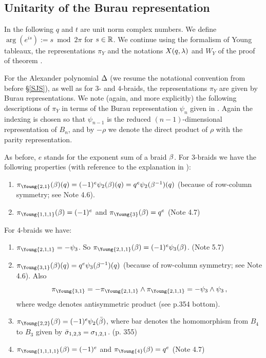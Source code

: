 \subsection{Unitarity of the Burau representation\label{SUn}}

In the following $q$ and $t$ are unit norm complex numbers.
We define $\arg (e^{is}):=s\bmod 2\pi$ for $s\in{\Bbb R}$.
We continue using the formalism of Young tableaux,
the representations $\pi_Y$ and the notations $X(q,\lambda)$
and $W_Y$ of the proof of theorem .

For the Alexander polynomial $\Delta$ (we resume the
notational convention from before \S\ref{SJS}), as well as
for $3$- and $4$-braids, the
representations $\pi_Y$ are given by Burau representations. We note
(again, and more explicitly) the following descriptions of $\pi_Y$
in terms of the Burau representation $\psi_n$ given in \cite{Jones}.
Again the indexing is chosen so that $\psi_{n-1}$ is the reduced
$(n-1)$-dimensional representation of $B_n$, and by $-\rho$ we denote
the direct product of $\rho$ with the parity representation.

As before, $e$ stands for the exponent sum of a braid $\beta$.
For $3$-braids we have the following properties (with
reference to the explanation in \cite{Jones}):
\begin{enumerate}
\item $\pi_{\Young{2,1}}(\bt)(q)=(-1)^e\psi_2(\bt)(q)=
q^e\psi_2(\bt^{-1})(q)$ (because of
row-column symmetry; see Note 4.6).
\item $\pi_{\Young{1,1,1}}(\bt)=(-1)^e$ and
$\pi_{\Young{3}}(\bt)=q^e$ (Note 4.7)
\end{enumerate}

For $4$-braids we have:
\begin{enumerate}
\item $\pi_{\Young{2,1,1}}=-\psi_3$. So
$\pi_{\Young{2,1,1}}(\bt)=(-1)^e\psi_3(\bt)$. (Note 5.7)
\item $\pi_{\Young{3,1}}(\bt)(q)=q^e\psi_3(\bt^{-1})(q)$ (because of
row-column symmetry; see Note 4.6). Also 
\[
\pi_{\Young{3,1}}=-\pi_{\Young{2,1,1}}\wedge
\pi_{\Young{2,1,1}}=-\psi_3\wedge \psi_3\,,
\]
where wedge denotes antisymmetric product (see p.354 bottom).
\item $\pi_{\Young{2,2}}(\bt)=(-1)^e\psi_2(\bar\bt)$, where bar denotes
the homomorphism from $B_4$ to $B_3$ given by $\bar{\sigma}_{1,2,3}=\sigma_{1,
2,1}$. (p. 355)
\item $\pi_{\Young{1,1,1,1}}(\bt)=(-1)^e$ and
$\pi_{\Young{4}}(\bt)=q^e$ (Note 4.7)
\end{enumerate}


